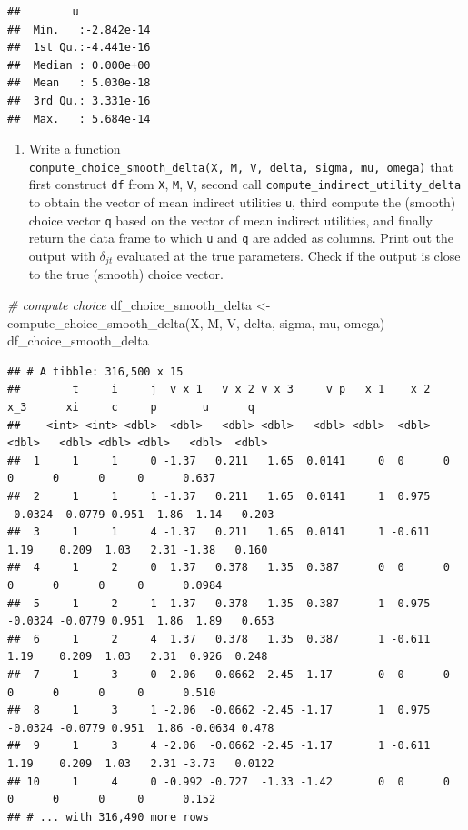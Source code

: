 \documentclass[
]{book}
\newenvironment{Shaded}{\begin{snugshade}}{\end{snugshade}}
\newcommand{\CommentTok}[1]{\textcolor[rgb]{0.56,0.35,0.01}{\textit{#1}}}
\newcommand{\FunctionTok}[1]{\textcolor[rgb]{0.00,0.00,0.00}{#1}}
\newcommand{\NormalTok}[1]{#1}
\newcommand{\OtherTok}[1]{\textcolor[rgb]{0.56,0.35,0.01}{#1}}
\providecommand{\tightlist}{%
  \setlength{\itemsep}{0pt}\setlength{\parskip}{0pt}}
\begin{document}
\begin{verbatim}
##        u             
##  Min.   :-2.842e-14  
##  1st Qu.:-4.441e-16  
##  Median : 0.000e+00  
##  Mean   : 5.030e-18  
##  3rd Qu.: 3.331e-16  
##  Max.   : 5.684e-14
\end{verbatim}

\begin{enumerate}
\def\labelenumi{\arabic{enumi}.}
\setcounter{enumi}{5}
\tightlist
\item
  Write a function \texttt{compute\_choice\_smooth\_delta(X,\ M,\ V,\ delta,\ sigma,\ mu,\ omega)} that first construct \texttt{df} from \texttt{X}, \texttt{M}, \texttt{V}, second call \texttt{compute\_indirect\_utility\_delta} to obtain the vector of mean indirect utilities \texttt{u}, third compute the (smooth) choice vector \texttt{q} based on the vector of mean indirect utilities, and finally return the data frame to which \texttt{u} and \texttt{q} are added as columns. Print out the output with \(\delta_{jt}\) evaluated at the true parameters. Check if the output is close to the true (smooth) choice vector.
\end{enumerate}

\begin{Shaded}
\begin{Highlighting}[]
\CommentTok{\# compute choice}
\NormalTok{df\_choice\_smooth\_delta }\OtherTok{\textless{}{-}} 
  \FunctionTok{compute\_choice\_smooth\_delta}\NormalTok{(X, M, V, delta, sigma, mu, omega)}
\NormalTok{df\_choice\_smooth\_delta}
\end{Highlighting}
\end{Shaded}

\begin{verbatim}
## # A tibble: 316,500 x 15
##        t     i     j  v_x_1   v_x_2 v_x_3     v_p   x_1    x_2     x_3      xi     c     p       u      q
##    <int> <int> <dbl>  <dbl>   <dbl> <dbl>   <dbl> <dbl>  <dbl>   <dbl>   <dbl> <dbl> <dbl>   <dbl>  <dbl>
##  1     1     1     0 -1.37   0.211   1.65  0.0141     0  0      0       0      0      0     0      0.637 
##  2     1     1     1 -1.37   0.211   1.65  0.0141     1  0.975 -0.0324 -0.0779 0.951  1.86 -1.14   0.203 
##  3     1     1     4 -1.37   0.211   1.65  0.0141     1 -0.611  1.19    0.209  1.03   2.31 -1.38   0.160 
##  4     1     2     0  1.37   0.378   1.35  0.387      0  0      0       0      0      0     0      0.0984
##  5     1     2     1  1.37   0.378   1.35  0.387      1  0.975 -0.0324 -0.0779 0.951  1.86  1.89   0.653 
##  6     1     2     4  1.37   0.378   1.35  0.387      1 -0.611  1.19    0.209  1.03   2.31  0.926  0.248 
##  7     1     3     0 -2.06  -0.0662 -2.45 -1.17       0  0      0       0      0      0     0      0.510 
##  8     1     3     1 -2.06  -0.0662 -2.45 -1.17       1  0.975 -0.0324 -0.0779 0.951  1.86 -0.0634 0.478 
##  9     1     3     4 -2.06  -0.0662 -2.45 -1.17       1 -0.611  1.19    0.209  1.03   2.31 -3.73   0.0122
## 10     1     4     0 -0.992 -0.727  -1.33 -1.42       0  0      0       0      0      0     0      0.152 
## # ... with 316,490 more rows
\end{verbatim}
\end{document}
